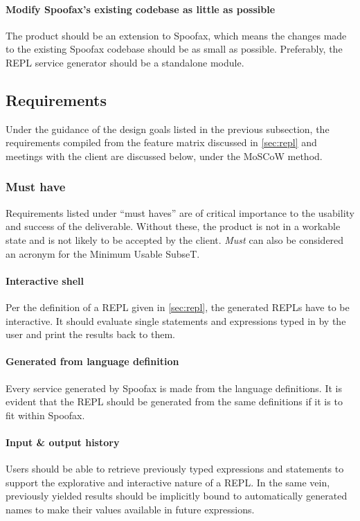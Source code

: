 \paragraph{Modify Spoofax's existing codebase as little as possible} The product
should be an extension to Spoofax, which means the changes made to the existing
Spoofax codebase should be as small as possible. Preferably, the REPL service
generator should be a standalone module.

\subsection{Requirements}
\label{ssec:requirements}

Under the guidance of the design goals listed in the previous subsection, the
requirements compiled from the feature matrix discussed in \cref{sec:repl} and
meetings with the client are discussed below, under the MoSCoW method.

\subsubsection{Must have}

Requirements listed under ``must haves'' are of critical importance to the
usability and success of the deliverable. Without these, the product is not in a
workable state and is not likely to be accepted by the client. \emph{Must} can
also be considered an acronym for the Minimum Usable SubseT.

\paragraph{Interactive shell} Per the definition of a REPL given in
\cref{sec:repl}, the generated REPLs have to be interactive. It should evaluate
single statements and expressions typed in by the user and print the results
back to them.

\paragraph{Generated from language definition} Every service generated by
Spoofax is made from the language definitions. It is evident that the REPL
should be generated from the same definitions if it is to fit within Spoofax.

\paragraph{Input \& output history} Users should be able to retrieve previously
typed expressions and statements to support the explorative and interactive
nature of a REPL. In the same vein, previously yielded results should be
implicitly bound to automatically generated names to make their values available
in future expressions.

